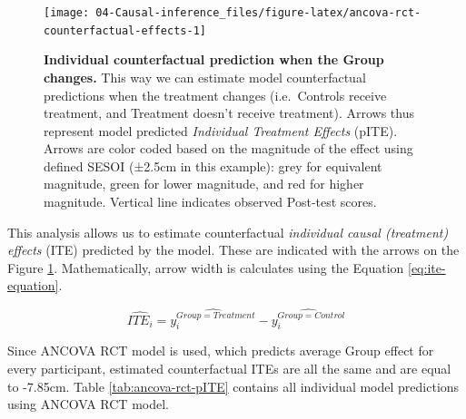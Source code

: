 \documentclass[
]{book}
\begin{document}
\begin{figure}

{\centering \texttt{[image: 04-Causal-inference\_files/figure-latex/ancova-rct-counterfactual-effects-1]} 

}

\caption{\textbf{Individual counterfactual prediction when the Group changes.} This way we can estimate model counterfactual predictions when the treatment changes (i.e.~Controls receive treatment, and Treatment doesn't receive treatment). Arrows thus represent model predicted \emph{Individual Treatment Effects} (pITE). Arrows are color coded based on the magnitude of the effect using defined SESOI (±2.5cm in this example): grey for equivalent magnitude, green for lower magnitude, and red for higher magnitude. Vertical line indicates observed Post-test scores.}\label{fig:ancova-rct-counterfactual-effects}
\end{figure}



This analysis allows us to estimate counterfactual \emph{individual causal (treatment) effects} (ITE) predicted by the model. These are indicated with the arrows on the Figure \ref{fig:ancova-rct-counterfactual-effects}. Mathematically, arrow width is calculates using the Equation \eqref{eq:ite-equation}.

\begin{equation}
  \widehat{ITE_i} = \widehat{y_{i}^{Group=Treatment}} - \widehat{y_{i}^{Group=Control}} 
  \label{eq:ite-equation}
\end{equation}

Since ANCOVA RCT model is used, which predicts average Group effect for every participant, estimated counterfactual ITEs are all the same and are equal to -7.85cm. Table \ref{tab:ancova-rct-pITE} contains all individual model predictions using ANCOVA RCT model.
\end{document}
